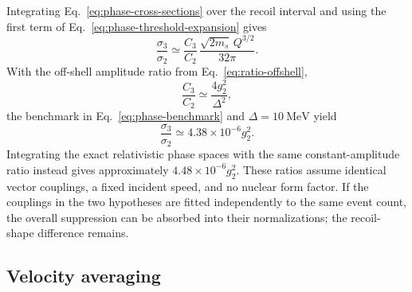 \documentclass[prd,showpacs,preprintnumbers,amsmath,amssymb,twocolumn,
superscriptaddress,notitlepage]{revtex4-2}
\begin{document}
Integrating Eq.~\eqref{eq:phase-cross-sections} over the recoil interval
and using the first term of Eq.~\eqref{eq:phase-threshold-expansion} gives
\begin{equation}
\boxed{
\frac{\sigma_3}{\sigma_2}
\simeq
\frac{C_3}{C_2}\,
\frac{\sqrt{2m_s}\,Q^{3/2}}{32\pi}.
}
\label{eq:phase-total-ratio}
\end{equation}
With the off-shell amplitude ratio from Eq.~\eqref{eq:ratio-offshell},
\begin{equation}
\frac{C_3}{C_2}\simeq\frac{4g_2^2}{\Delta^2},
\end{equation}
the benchmark in Eq.~\eqref{eq:phase-benchmark} and
$\Delta=10~\mathrm{MeV}$ yield
\begin{equation}
\frac{\sigma_3}{\sigma_2}
\simeq4.38\times10^{-6}g_2^2.
\label{eq:phase-total-numerical}
\end{equation}
Integrating the exact relativistic phase spaces with the same
constant-amplitude ratio instead gives approximately
$4.48\times10^{-6}g_2^2$.
These ratios assume identical vector couplings, a fixed incident speed,
and no nuclear form factor.
If the couplings in the two hypotheses are fitted independently to the
same event count, the overall suppression can be absorbed into their
normalizations; the recoil-shape difference remains.

\subsection{Velocity averaging}
\end{document}
